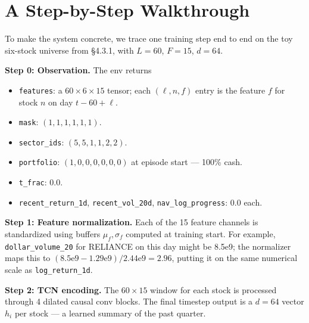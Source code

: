 \documentclass[11pt,a4paper]{article}
\begin{document}
\section{A Step-by-Step Walkthrough}
\label{sec:walkthrough}

To make the system concrete, we trace one training step end to end on the toy
six-stock universe from \S4.3.1, with $L = 60$, $F = 15$, $d = 64$.

\textbf{Step 0: Observation.} The env returns
\begin{itemize}
\item \texttt{features}: a $60 \times 6 \times 15$ tensor; each $(\ell, n, f)$ entry
is the feature $f$ for stock $n$ on day $t - 60 + \ell$.
\item \texttt{mask}: $(1, 1, 1, 1, 1, 1)$.
\item \texttt{sector\_ids}: $(5, 5, 1, 1, 2, 2)$.
\item \texttt{portfolio}: $(1, 0, 0, 0, 0, 0, 0)$ at episode start --- 100\% cash.
\item \texttt{t\_frac}: $0.0$.
\item \texttt{recent\_return\_1d}, \texttt{recent\_vol\_20d}, \texttt{nav\_log\_progress}: $0.0$ each.
\end{itemize}

\textbf{Step 1: Feature normalization.} Each of the 15 feature channels is
standardized using buffers $\mu_f, \sigma_f$ computed at training start. For example,
\texttt{dollar\_volume\_20} for RELIANCE on this day might be 8.5e9; the normalizer
maps this to $(8.5\text{e9} - 1.29\text{e9}) / 2.44\text{e9} = 2.96$, putting it on
the same numerical scale as \texttt{log\_return\_1d}.

\textbf{Step 2: TCN encoding.} The $60 \times 15$ window for each stock is
processed through 4 dilated causal conv blocks. The final timestep output is
a $d = 64$ vector $h_i$ per stock --- a learned summary of the past quarter.
\end{document}
